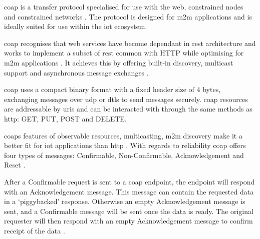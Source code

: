 \acrfull{coap} is a transfer protocol specialised for use with the web, constrained
nodes and constrained networks \citep{shelby_constrained_2014}. The protocol is 
designed for \gls{m2m} applications and is ideally suited for use within the 
\gls{iot} ecosystem.

\gls{coap} recognises that web services have become dependant in \gls{rest} 
architecture and works to implement a subset of \gls{rest} common with HTTP while
optimising for \gls{m2m} applications \citep{shelby_constrained_2014}. It achieves 
this by offering built-in discovery, multicast support and asynchronous message 
exchanges \citep{shelby_constrained_2014}. 

\gls{coap} uses a compact binary format with a fixed header size of 4 bytes, 
exchanging messages over \gls{udp} or \gls{dtls} to send messages securely. \gls{coap} 
resources are addressable by \glspl{uri} and can be interacted with through the 
same methods as \gls{http}: GET, PUT, POST and DELETE.

\glspl{coap} features of observable resources, multicasting, \gls{m2m} discovery 
make it a better fit for \gls{iot} applications than \gls{http} \citep{kovatsch_californium:_2014}.
With regards to reliability \gls{coap} offers four types of messages: Confirmable, 
Non-Confirmable, Acknowledgement and Reset \citep{bellavista_towards_2016}.

After a Confirmable request is sent to a \gls{coap} endpoint, the endpoint will 
respond with an Acknowledgement message. This message can contain the requested 
data in a `piggybacked' response. Otherwise an empty Acknowledgement message is sent, 
and a Confirmable message will be sent once the data is ready. The original
requester will then respond with an empty Acknowledgement message to confirm receipt 
of the data \citep{shelby_constrained_2014}.
